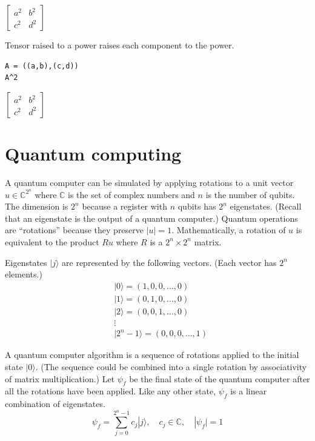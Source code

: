 \documentclass[12pt]{article}
\begin{document}
$\displaystyle
\begin{bmatrix}
a^2 & b^2
\\[1ex]
c^2 & d^2
\end{bmatrix}
$

\bigskip

Tensor raised to a power raises each component to the power.

{\color{blue}
\begin{verbatim}
A = ((a,b),(c,d))
A^2
\end{verbatim}}

$\displaystyle
\begin{bmatrix}
a^2 & b^2
\\[1ex]
c^2 & d^2
\end{bmatrix}
$

\newpage

\section{Quantum computing}

A quantum computer can be simulated by applying rotations to a
unit vector
$u\in\mathbb{C}^{2^n}$ where $\mathbb{C}$ is the set of complex numbers
and $n$ is the number of qubits.
The dimension is $2^n$ because a register with $n$ qubits
has $2^n$ eigenstates.
(Recall that an eigenstate is the output of a quantum computer.)
Quantum operations are ``rotations'' because they preserve $|u|=1$.
Mathematically, a rotation of $u$ is equivalent to the product $Ru$
where $R$ is a $2^n\times2^n$ matrix.

\bigskip
Eigenstates $|j\rangle$ are represented by the following vectors.
(Each vector has $2^n$ elements.)
\begin{align*}
&|0\rangle=(1,0,0,\dots,0)
\\
&|1\rangle=(0,1,0,\ldots,0)
\\
&|2\rangle=(0,0,1,\ldots,0)
\\
&\vdots
\\
&|2^n-1\rangle=(0,0,0,\ldots,1)
\end{align*}

A quantum computer algorithm is a sequence of rotations
applied to the initial state $|0\rangle$.
(The sequence could be combined into a single rotation
by associativity of matrix multiplication.)
Let $\psi_f$ be the final state of the quantum computer
after all the rotations have been applied.
Like any other state, $\psi_f$ is a linear combination of eigenstates.
\begin{equation*}
\psi_f=\sum_{j=0}^{2^n-1}c_j|j\rangle,
\quad
c_j\in\mathbb C,
\quad
|\psi_f|=1
\end{equation*}
\end{document}

